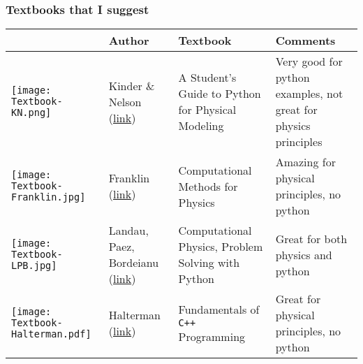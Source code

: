 \documentclass[hyperref={colorlinks=true}]{beamer}
\begin{document}
\begin{frame}[shrink=15]
  \frametitle{Textbooks that I suggest}

  \begin{table}[htbp]
  \centering
  \begin{tabular}{b{} b{3cm} b{5cm} b{3.5cm} }
    \hline
     & Author & Textbook & Comments \\ 
    \hline
    \texttt{[image: Textbook-KN.png]} & Kinder \& Nelson (\href{http://physicalmodelingwithpython.blogspot.com/}{link}) & A Student's Guide to Python for Physical Modeling & Very good for python examples, not great for physics principles \\ 
    \texttt{[image: Textbook-Franklin.jpg]} & Franklin (\href{http://www.reed.edu/physics/courses/P367.F14oldX!/downloads/index.html}{link}) & Computational Methods for Physics & Amazing for physical principles, no python \\ 
    \texttt{[image: Textbook-LPB.jpg]} & Landau, Paez, Bordeianu (\href{http://physics.oregonstate.edu/~landaur/Books/CPbook/Codes/}{link})  & Computational Physics, Problem Solving with Python & Great for both physics and python \\ 
    \texttt{[image: Textbook-Halterman.pdf]} & Halterman (\href{http://python.cs.southern.edu/cppbook/progcpp.pdf}{link}) & Fundamentals of \texttt{C++} Programming & Great for physical principles, no python \\ 
    \hline
  \end{tabular}
  \end{table}
  
  
\end{frame}

\end{document}
